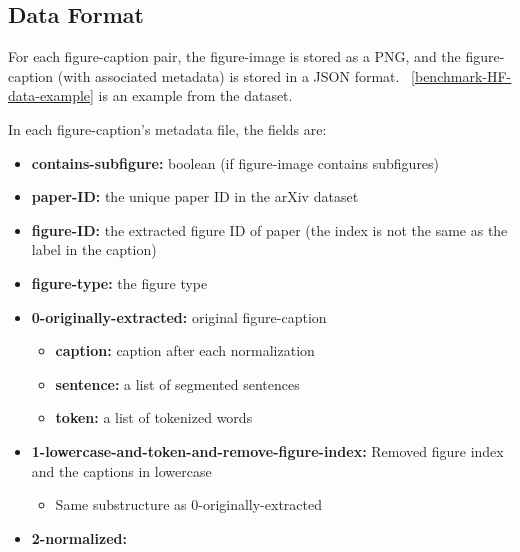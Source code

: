 \documentclass[11pt]{article}
\begin{document}
\subsection{Data Format} \label{format}
For each figure-caption pair, the figure-image is stored as a PNG, and the figure-caption (with associated metadata) is stored in a JSON format. ~\ref{benchmark-HF-data-example} is an example from the dataset.

In each figure-caption's metadata file, the fields are: 

\begin{itemize}

\item
  \textbf{contains-subfigure:} boolean (if figure-image contains
  subfigures)
\item
  \textbf{paper-ID:} the unique paper ID in the arXiv dataset
\item
  \textbf{figure-ID:} the extracted figure ID of paper (the index is not
  the same as the label in the caption)
\item
  \textbf{figure-type:} the figure type
\item
  \textbf{0-originally-extracted:} original figure-caption
  \begin{itemize}
\item
  \textbf{caption:} caption after each normalization
\item
  \textbf{sentence:} a list of segmented sentences
\item
  \textbf{token:} a list of tokenized words
\end{itemize}
\item
  \textbf{1-lowercase-and-token-and-remove-figure-index:} Removed figure
  index and the captions in lowercase
  \begin{itemize}
      \item Same substructure as 0-originally-extracted
  \end{itemize}
  
\item
  \textbf{2-normalized:}


\end{itemize}
\end{document}
